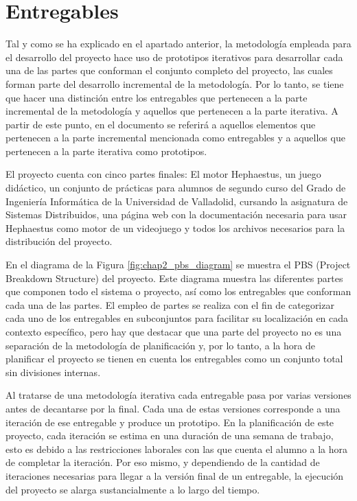 \section{Entregables}

Tal y como se ha explicado en el apartado anterior, la metodología empleada para el desarrollo del proyecto hace uso de prototipos iterativos para desarrollar cada una de las partes que conforman el conjunto completo del proyecto, las cuales forman parte del desarrollo incremental de la metodología. Por lo tanto, se tiene que hacer una distinción entre los entregables que pertenecen a la parte incremental de la metodología y aquellos que pertenecen a la parte iterativa. A partir de este punto, en el documento se referirá a aquellos elementos que pertenecen a la parte incremental mencionada como entregables y a aquellos que pertenecen a la parte iterativa como prototipos.

El proyecto cuenta con cinco partes finales: El motor Hephaestus, un juego didáctico, un conjunto de prácticas para alumnos de segundo curso del Grado de Ingeniería Informática de la Universidad de Valladolid, cursando la asignatura de Sistemas Distribuidos, una página web con la documentación necesaria para usar Hephaestus como motor de un videojuego y todos los archivos necesarios para la distribución del proyecto.

En el diagrama de la Figura \ref{fig:chap2_pbs_diagram} se muestra el PBS (Project Breakdown Structure) del proyecto. Este diagrama muestra las diferentes partes que componen todo el sistema o proyecto, así como los entregables que conforman cada una de las partes. El empleo de partes se realiza con el fin de categorizar cada uno de los entregables en subconjuntos para facilitar su localización en cada contexto específico, pero hay que destacar que una parte del proyecto no es una separación de la metodología de planificación y, por lo tanto, a la hora de planificar el proyecto se tienen en cuenta los entregables como un conjunto total sin divisiones internas.

Al tratarse de una metodología iterativa cada entregable pasa por varias versiones antes de decantarse por la final. Cada una de estas versiones corresponde a una iteración de ese entregable y produce un prototipo. En la planificación de este proyecto, cada iteración se estima en una duración de una semana de trabajo, esto es debido a las restricciones laborales con las que cuenta el alumno a la hora de completar la iteración. Por eso mismo, y dependiendo de la cantidad de iteraciones necesarias para llegar a la versión final de un entregable, la ejecución del proyecto se alarga sustancialmente a lo largo del tiempo.

